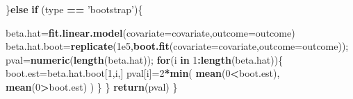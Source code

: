 \documentclass[12pt,]{book}
\newenvironment{Shaded}{\begin{snugshade}}{\end{snugshade}}
\newcommand{\KeywordTok}[1]{\textcolor[rgb]{0.13,0.29,0.53}{\textbf{#1}}}
\newcommand{\DataTypeTok}[1]{\textcolor[rgb]{0.13,0.29,0.53}{#1}}
\newcommand{\DecValTok}[1]{\textcolor[rgb]{0.00,0.00,0.81}{#1}}
\newcommand{\FloatTok}[1]{\textcolor[rgb]{0.00,0.00,0.81}{#1}}
\newcommand{\StringTok}[1]{\textcolor[rgb]{0.31,0.60,0.02}{#1}}
\newcommand{\ControlFlowTok}[1]{\textcolor[rgb]{0.13,0.29,0.53}{\textbf{#1}}}
\newcommand{\OperatorTok}[1]{\textcolor[rgb]{0.81,0.36,0.00}{\textbf{#1}}}
\newcommand{\NormalTok}[1]{#1}
\begin{document}
\begin{Shaded}
\begin{Highlighting}[]
\NormalTok{  \}}\ControlFlowTok{else} \ControlFlowTok{if}\NormalTok{ (type }\OperatorTok{==}\StringTok{ 'bootstrap'}\NormalTok{)\{}
    
\NormalTok{    beta.hat=}\KeywordTok{fit.linear.model}\NormalTok{(}\DataTypeTok{covariate=}\NormalTok{covariate,}\DataTypeTok{outcome=}\NormalTok{outcome)}
\NormalTok{    beta.hat.boot=}\KeywordTok{replicate}\NormalTok{(}\FloatTok{1e5}\NormalTok{,}\KeywordTok{boot.fit}\NormalTok{(}\DataTypeTok{covariate=}\NormalTok{covariate,}\DataTypeTok{outcome=}\NormalTok{outcome));}
\NormalTok{    pval=}\KeywordTok{numeric}\NormalTok{(}\KeywordTok{length}\NormalTok{(beta.hat));}
    \ControlFlowTok{for}\NormalTok{(i }\ControlFlowTok{in} \DecValTok{1}\OperatorTok{:}\KeywordTok{length}\NormalTok{(beta.hat))\{}
\NormalTok{      boot.est=beta.hat.boot[}\DecValTok{1}\NormalTok{,i,]}
\NormalTok{      pval[i]=}\DecValTok{2}\OperatorTok{*}\KeywordTok{min}\NormalTok{( }\KeywordTok{mean}\NormalTok{(}\DecValTok{0}\OperatorTok{<}\NormalTok{boot.est), }\KeywordTok{mean}\NormalTok{(}\DecValTok{0}\OperatorTok{>}\NormalTok{boot.est) )}
\NormalTok{    \}}
\NormalTok{  \}}
  \KeywordTok{return}\NormalTok{(pval)}
\NormalTok{\}}
\end{Highlighting}
\end{Shaded}
\end{document}
